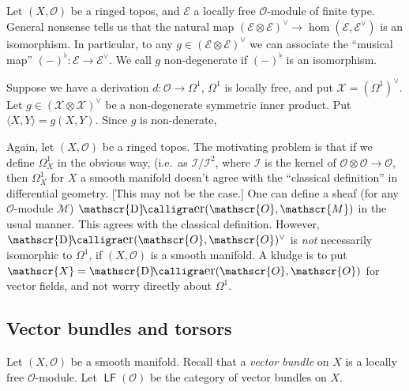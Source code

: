 \documentclass{article}
\DeclareMathOperator{\derivation}{\mathscr{D}\text{\kern -2pt {\calligra\large er}}}
\DeclareMathOperator{\locallyfree}{\mathsf{LF}}
\newcommand{\sO}{\mathscr{O}}
\newcommand{\sE}{\mathscr{E}}
\newcommand{\sI}{\mathscr{I}}
\newcommand{\sM}{\mathscr{M}}
\newcommand{\sX}{\mathscr{X}}
\begin{document}
Let $(X,\sO)$ be a ringed topos, and $\sE$ a locally free $\sO$-module of 
finite type. General nonsense tells us that the natural map 
$(\sE\otimes\sE)^\vee \to \hom(\sE,\sE^\vee)$ is an isomorphism. In particular, 
to any $g\in (\sE\otimes \sE)^\vee$ we can associate the ``musical map'' 
$(-)^\flat:\sE\to \sE^\vee$. We call $g$ non-degenerate if $(-)^\flat$ is an 
isomorphism. 


Suppose we have a derivation $d:\sO\to \Omega^1$, $\Omega^1$ is locally free, 
and put $\sX=(\Omega^1)^\vee$. Let $g\in (\sX\otimes \sX)^\vee$ be a non-degenerate 
symmetric inner product. Put $\langle X,Y\rangle = g(X,Y)$. Since $g$ is 
non-denerate, 

Again, let $(X,\sO)$ be a ringed topos. The motivating problem is that if we 
define $\Omega^1_X$ in the obvious way, (i.e.\ as $\sI/\sI^2$, where $\sI$ is 
the kernel of $\sO\otimes \sO \to \sO$, then $\Omega_X^1$ for $X$ a smooth 
manifold doesn't agree with the ``classical definition'' in differential 
geometry. [This may not be the case.] One can define a sheaf (for any 
$\sO$-module $\sM$) $\derivation(\sO,\sM)$ in the usual manner. This agrees 
with the classical definition. However, $\derivation(\sO,\sO)^\vee$ is 
\emph{not} necessarily isomorphic to $\Omega^1$, if $(X,\sO)$ is a smooth 
manifold. A kludge is to put $\sX=\derivation(\sO,\sO)$ for vector fields, and 
not worry directly about $\Omega^1$. 





\subsection{Vector bundles and torsors}

Let $(X,\sO)$ be a smooth manifold. Recall that a \emph{vector bundle} on 
$X$ is a locally free $\sO$-module. Let $\locallyfree(\sO)$ be the category of 
vector bundles on $X$. 
\end{document}
